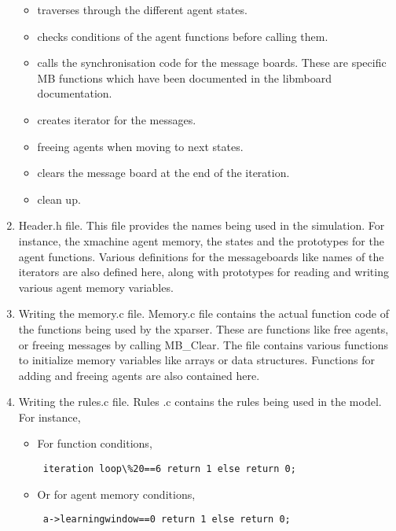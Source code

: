 \begin{enumerate}
\begin{itemize}
\item traverses through the different agent states.
\item checks conditions of the agent functions before calling them.
\item calls the synchronisation code for the message boards. These are specific MB functions which have been documented in the libmboard documentation.
\item creates iterator for the messages.
\item freeing agents when moving to next states.
\item clears the message board at the end of the iteration.
\item clean up.
\end{itemize}

\item Header.h file. This file provides the names being used in the simulation. For instance, the xmachine agent memory, the states and the prototypes for the agent functions.
Various definitions for the messageboards like names of the iterators are also defined here, along with prototypes for reading and writing various agent memory variables.

\item Writing the memory.c file. Memory.c file contains the actual function code of the functions being used by the xparser. These are functions like free agents, or freeing messages by calling MB\_Clear. The file contains various functions to initialize memory variables like arrays or data structures. Functions for adding and freeing agents are also contained here.

\item Writing the rules.c file. Rules .c contains the rules being used in the model. For instance,

\begin{itemize}
\item For function conditions,

\begin{mylisting}
\begin{verbatim}
 iteration loop\%20==6 return 1 else return 0;  
 \end{verbatim}
 \end{mylisting}
 
 \item Or for agent memory conditions,\\

 \begin{mylisting}
\begin{verbatim}
 a->learningwindow==0 return 1 else return 0;
 \end{verbatim}
 \end{mylisting}
 

\end{itemize}
\end{enumerate}
